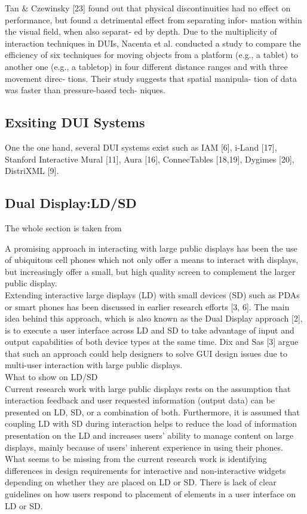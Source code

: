 \cite{vanderdonckt2010distributed} Tan & Czewinsky [23] found out that physical
discontinuities had no effect on performance, but found a detrimental effect from separating infor- mation within the visual field, when also separat- ed by depth. Due to the multiplicity of interaction techniques in DUIs, Nacenta et al. conducted a study to compare the efficiency of six techniques for moving objects from a platform (e.g., a tablet) to another one (e.g., a tabletop) in four different distance ranges and with three movement direc- tions. Their study suggests that spatial manipula- tion of data was faster than pressure-based tech- niques.\\

\subsection{Exsiting DUI Systems}
\cite{demeure20084c} One the one hand, several DUI systems exist such as IAM
[6], i-Land [17], Stanford Interactive Mural [11], Aura [16], ConnecTables [18,19], Dygimes [20], DistriXML [9].

\subsection{Dual Display:LD/SD}
The whole section is taken from \cite{kaviani2011dual}

A promising approach in interacting with large public displays has been the use
of ubiquitous cell phones which not only offer a means to interact with
displays, but increasingly offer a small, but high quality screen to complement
the larger public display.\\

Extending interactive large displays (LD) with small devices (SD) such as PDAs
or smart phones has been discussed in earlier research efforts [3, 6]. The main
idea behind this approach, which is also known as the Dual Display approach [2],
is to execute a user interface across LD and SD to take advantage of input and
output capabilities of both device types at the same time. Dix and Sas [3] argue
that such an approach could help designers to solve GUI design issues due to multi-user interaction with large public displays.\\

What to show on LD/SD\\
Current research work with large public displays rests on the assumption that
interaction feedback and user requested information (output data) can be
presented on LD, SD, or a combination of both. Furthermore, it is assumed that
coupling LD with SD during interaction helps to reduce the load of information presentation on the LD and increases users’ ability to manage content on large displays, mainly because of users’ inherent experience in using their phones. What seems to be missing from the current research work is identifying differences in design requirements for interactive and non-interactive widgets depending on whether they are placed on LD or SD. There is lack of clear guidelines on how users respond to placement of elements in a user interface on LD or SD.\\

